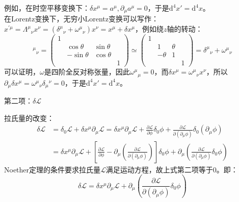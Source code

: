 \documentclass{book}
\begin{document}
\begin{mdframed}[frametitle={Example}]
例如，在时空平移变换下：$\delta x^\mu=a^\mu,\partial_\mu a^\mu=0$，于是$\mathrm{d}^4x'=\mathrm{d}^4x$。\\
在Lorentz变换下，无穷小Lorentz变换可以写作：$x^{\prime\mu}=\Lambda^\mu{}_\nu x^\nu=(\delta ^\mu{}_\nu+\omega^\mu{}_\nu)x^\nu=x^\mu+\delta x^\mu$，例如绕$z$轴的转动：
\begin{equation}
	[R_z(\theta)]^{\mu}{}_\nu=\begin{pmatrix}1\\&\cos\theta&\sin\theta\\&-\sin\theta&\cos\theta\\&&&1\end{pmatrix}\simeq\begin{pmatrix}1\\&1&\theta\\&-\theta&1\\&&&1\end{pmatrix}=\delta ^\mu{}_\nu+\omega^\mu{}_\nu
\end{equation}
可以证明，$\omega$是四阶全反对称张量，因此$\omega^\mu{}_\mu=0$，而$\delta x^\mu=\omega^\mu{}_\nu x^\nu$，所以$\partial_\mu\delta x^\mu=\omega^\mu{}_\nu\delta_\mu{}^\nu=0$，于是$\mathrm{d}^4x'=\mathrm{d}^4x$。
\end{mdframed}

第二项：$\delta \mathscr{L}$

拉氏量的改变：
\begin{equation}
    \begin{aligned}
        \delta\mathscr{L}&=\delta_{0}\mathscr{L}+\delta x^{\mu}\partial_{\mu}\mathscr{L}=\delta x^{\mu}\partial_{\mu}\mathscr{L}+\frac{\partial\mathscr{L}}{\partial\phi}\delta_{0}\phi+\frac{\partial\mathscr{L}}{\partial(\partial_{\mu}\phi)}\delta_{0}(\partial_{\mu}\phi)\\&=\delta x^\mu\partial_\mu\mathscr{L}+\left[\frac{\partial\mathscr{L}}{\partial\phi}-\partial_\mu\left(\frac{\partial\mathscr{L}}{\partial(\partial_\mu\phi)}\right)\right]\delta_0\phi+\partial_\mu\left(\frac{\partial\mathscr{L}}{\partial(\partial_\mu\phi)}\delta_0\phi\right)
    \end{aligned}
\end{equation}
Noether定理的条件要求拉氏量$\mathscr{L}$满足运动方程，故上式第二项等于$0$。即：
\begin{equation}
	\delta \mathscr{L}=\delta x^\mu\partial_\mu\mathscr{L}+\partial_\mu\left(\frac{\partial\mathscr{L}}{\partial(\partial_\mu\phi)}\delta_0\phi\right)
\end{equation}
\end{document}
